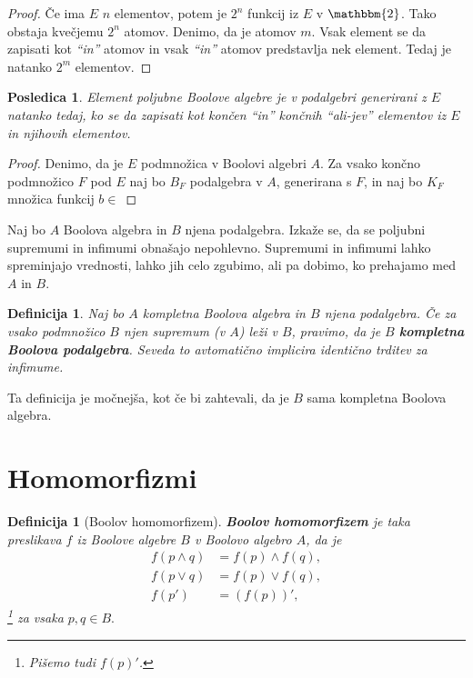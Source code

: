 \documentclass{amsart}
\newtheorem{posledica}[izrek]{Posledica}
\newtheorem{definicija}[izrek]{Definicija}
\begin{document}
\begin{proof}
    Če ima $E$ $n$ elementov, potem je $2^n$ funkcij iz $E$ v $\mathbbm{2}$.
    Tako obstaja kvečjemu $2^n$ atomov. Denimo, da je atomov $m$. 
    Vsak element se da zapisati kot \textit{``in''} atomov 
    in vsak \textit{``in''} atomov predstavlja nek element. 
    Tedaj je natanko $2^{m}$ elementov.
\end{proof}

\begin{posledica}
    Element poljubne Boolove algebre je v podalgebri generirani z $E$ natanko tedaj,
    ko se da zapisati kot končen \textit{``in''} končnih \textit{``ali-jev''} elementov iz $E$ 
    in njihovih elementov.
\end{posledica}

\begin{proof}
    Denimo, da je $E$ podmnožica v Boolovi algebri $A$. Za vsako končno podmnožico $F$ pod $E$
    naj bo $B_F$ podalgebra v $A$, generirana s $F$, in naj bo $K_F$ množica funkcij
    $b \in$ 
\end{proof}


Naj bo $A$ Boolova algebra in $B$ njena podalgebra.
Izkaže se, da se poljubni supremumi in infimumi obnašajo nepohlevno.
Supremumi in infimumi lahko spreminjajo vred\-nos\-ti, lahko jih celo zgubimo, ali pa dobimo,
ko prehajamo med $A$ in $B$.

\begin{definicija}
    Naj bo $A$ kompletna Boolova algebra in $B$ njena podalgebra.
    Če za vsako podmnožico $B$ njen supremum (v $A$) leži v $B$, pravimo, da je 
    $B$ \textbf{kompletna Boolova podalgebra}. Seveda to avtomatično implicira identično trditev za infimume.
\end{definicija}

Ta definicija je močnejša, kot če bi zahtevali, da je $B$ sama kompletna Boolova algebra.


\section{Homomorfizmi}

\begin{definicija}[Boolov homomorfizem]
    \textbf{Boolov homomorfizem} je taka preslikava $f$ iz Boolove algebre $B$ v 
    Boolovo algebro $A$, da je 
    \begin{align*}
        f(p \wedge q) &= f(p) \wedge f(q),\\
        f(p \vee q) &= f(p) \vee f(q),\\
        f(p') &= (f(p))',
    \end{align*}\footnote{Pišemo tudi \(f(p)'\).}
    za vsaka \(p, q \in B.\)
\end{definicija}
\end{document}
